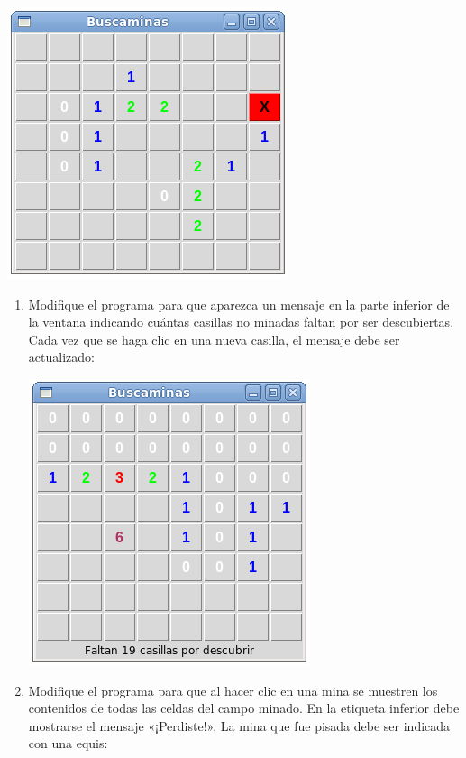 \includegraphics{../../_static/capturas/bm2.png}

\begin{enumerate}
\item
  Modifique el programa para que aparezca un mensaje en la parte
  inferior de la ventana indicando cuántas casillas no minadas faltan
  por ser descubiertas. Cada vez que se haga clic en una nueva casilla,
  el mensaje debe ser actualizado:

  \includegraphics{../../_static/capturas/bm3.png}
\item
  Modifique el programa para que al hacer clic en una mina se muestren
  los contenidos de todas las celdas del campo minado. En la etiqueta
  inferior debe mostrarse el mensaje «¡Perdiste!». La mina que fue
  pisada debe ser indicada con una equis:


\end{enumerate}
